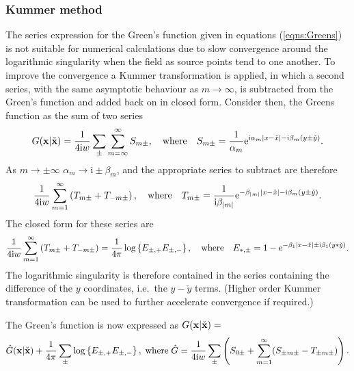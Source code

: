 \documentclass[12pt,a4paper]{article}
\def\ci{{\mathrm i}}
\renewcommand{\exp}{{\rm e}}
\newcommand{\ie}{i.e.\ }
\newcommand{\xo}{\check{x}}
\newcommand{\yo}{\check{y}}
\newcommand{\bx}{{\bf x}}
\newcommand{\bxo}{\check{\textbf{x}}}
\begin{document}
%

\subsubsection{Kummer method}

The series expression for the Green's function given in equations (\ref{eqns:Greens}) is not suitable for numerical calculations due to slow convergence around the logarithmic singularity when the field as source points tend to one another.
To improve the convergence a Kummer transformation is applied, in which a second series, with the same asymptotic behaviour as $m\to\infty$, is subtracted from the Green's function and added back on in closed form.
Consider then, the Greens function as the sum of two series 
\begin{equation}
G(\bx\vert\bxo)
=
\frac{1}{4\ci w}
\sum_{\pm}
\sum_{m=\infty}^{\infty}S_{m\pm},
\quad
\text{where}
\quad
S_{m\pm}
=
\frac{1}{\alpha_{m}}
\exp^{\ci\alpha_{m}\vert x-\xo\vert - \ci\beta_{m}(y\pm\yo)}
.
\end{equation}
As $m\to\pm\infty$ $\alpha_{m}\to\ci\pm\beta_{m}$, and
the appropriate series to subtract are therefore
\begin{equation}
\frac{1}{4\ci w}
\sum_{m=1}^{\infty}
\left(
T_{m\pm}
+
T_{-m\pm}
\right)
,
\quad
\text{where}
\quad
T_{m\pm}
=
\frac{1}{\ci\beta_{\vert m \vert}}
\exp^{-\beta_{\vert m\vert}\vert x-\xo\vert - \ci\beta_{m}(y\pm\yo)}.
\end{equation}
The closed form for these series are
\begin{equation}\nonumber
\frac{1}{4\ci w}
\sum_{m=1}^{\infty}
\left(
T_{m\pm}
+
T_{-m\pm}
\right)
=
\frac{1}{4\pi}
\log\left\{
E_{\pm,+}
E_{\pm,-}
\right\},
\quad
\text{where}
\quad
E_{\ast,\pm}
=
1-\exp^{-\beta_{1}\vert x-\xo\vert \pm\ci\beta_{1}(y\ast\yo)}
.
\end{equation}
The logarithmic singularity is therefore contained in the series containing the difference of the $y$ coordinates, \ie the $y-\yo$ terms.
(Higher order Kummer transformation can be used to further accelerate convergence if required.)

The Green's function is now expressed as $G(\bx\vert\bxo)=$
\begin{equation}\nonumber
\hat{G}(\bx\vert\bxo)
+
\frac{1}{4\pi}
\sum_{\pm}
\log\left\{
E_{\pm,+}
E_{\pm,-}
\right\},
\;
\text{where}
\;
\hat{G}
=
\frac{1}{4\ci w}
\sum_{\pm}
\left(
S_{0\pm}
+
\sum_{m=1}^{\infty}
(S_{\pm m\pm}-T_{\pm m\pm})
\right).
\end{equation}
\end{document}
